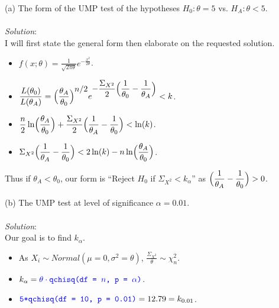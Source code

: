 \documentclass[12pt]{article}
\newcommand{\XBB}{\color{blue}}
\newcommand{\ds}{\displaystyle}
\begin{document}
(a) The form of the UMP test of the hypotheses $ H_{0} : \theta = 5 $ vs. $ H_{A} : \theta < 5 $. \\
\vspace{2.5mm} \\
\textit{Solution}:
\vspace{2.5mm} \\

\noindent
I will first state the general form then elaborate on the requested solution. \\

\begin{itemize}
    \item $ \ds f(x; \theta) = \frac{1}{\sqrt{2\pi\theta}} e^{\ds -\frac{x^{2}}{2\theta}} $.
    \item $ \ds \frac{L(\theta_{0})}{L(\theta_{A})} = \Bigl( \frac{\theta_{A}}{\theta_{0}} \Bigr)^{\ds n/2} e^{\ds -\frac{\Sigma_{X^{2}}}{2}\Bigl( \frac{1}{\theta_{0}} - \frac{1}{\theta_{A}} \Bigr)} < k $.
    \item $ \ds \frac{n}{2}\ln\Bigl( \frac{\theta_{A}}{\theta_{0}} \Bigr) + \frac{\Sigma_{X^{2}}}{2}\Bigl( \frac{1}{\theta_{A}} - \frac{1}{\theta_{0}} \Bigr) < \ln(k) $.
    \item $ \ds \Sigma_{X^{2}}\Bigl( \frac{1}{\theta_{A}} - \frac{1}{\theta_{0}} \Bigr) < 2\ln(k) - n\ln\Bigl( \frac{\theta_{A}}{\theta_{0}} \Bigr) $.
\end{itemize}

\noindent
Thus if $ \theta_{A} < \theta_{0} $, our form is ``Reject $ H_{0} $ if $ \Sigma_{X^{2}} < k_{\alpha} $'' as $ \ds \Bigl( \frac{1}{\theta_{A}} - \frac{1}{\theta_{0}} \Bigr) > 0 $. \\

\vspace{2.5mm}

\newpage

(b) The UMP test at level of significance $ \alpha = 0.01 $. \\
\vspace{2.5mm} \\
\textit{Solution}:
\vspace{2.5mm} \\

\noindent
Our goal is to find $ k_{\alpha} $. \\

\begin{itemize}
    \item As $ X_{i} \sim Normal(\mu=0, \sigma^{2}=\theta) $, $\ds \frac{\Sigma_{X^{2}}}{\theta} \sim \chi^{2}_{n} $.
    \item $ \ds k_{\alpha} = {\XBB \theta \cdot \texttt{qchisq(df = $ n $, p = $ \alpha $)}} $.
    \item $ \ds {\XBB \texttt{5*qchisq(df = 10, p = 0.01)}} = 12.79 = k_{0.01} $.
\end{itemize}
\end{document}
